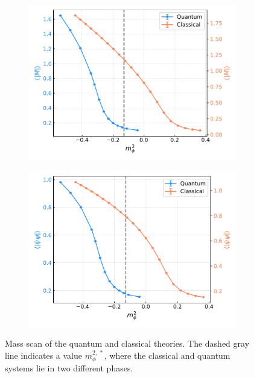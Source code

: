 \begin{figure}[h]
    \centering
    \captionsetup[subfigure]{justification=centering}
    \begin{subfigure}[t]{0.45\textwidth}
        \centering
        \includegraphics[scale=0.45]{figures/chiral_PT/mass_scan/magnetisation.pdf}
    \end{subfigure}
    \hfill
    \begin{subfigure}[t]{0.45\textwidth}
        \centering
        \includegraphics[scale=0.45]{figures/chiral_PT/mass_scan/condensate.pdf}
    \end{subfigure}
    \caption[Mass scan of the quantum and classical theories]{Mass scan of the quantum and classical theories. The dashed gray line indicates a value $m_\phi^{2, \,*}$, where the classical and quantum systems lie in two different phases.}
    \label{fig:scans_classical_quantum}
\end{figure} 

